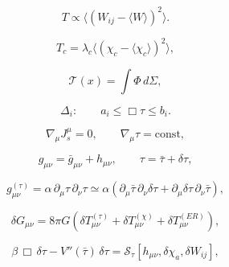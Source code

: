 \[
T \propto \langle (W_{ij} - \langle W\rangle)^2 \rangle.
\]

\[
T_c = \lambda_c \langle (\chi_c - \langle\chi_c\rangle)^2\rangle,
\]

\[
\mathcal{T}(x) = \int \Phi\, d\Sigma,
\]

\[
\Delta_i: \qquad a_i \le \Box \tau \le b_i.
\]

\[
\nabla_\mu J^\mu_s = 0,\qquad \nabla_\mu \tau = \mathrm{const},
\]

\[
g_{\mu\nu} = \bar{g}_{\mu\nu} + h_{\mu\nu},\qquad
\tau = \bar{\tau} + \delta\tau,
\]

\[
g^{(\tau)}_{\mu\nu}
=
\alpha\, \partial_\mu \tau\, \partial_\nu\tau
\simeq
\alpha\left(
\partial_\mu \bar{\tau}\, \partial_\nu \delta\tau
+
\partial_\mu \delta\tau\, \partial_\nu \bar{\tau}
\right),
\]

\[
\delta G_{\mu\nu}
=
8\pi G\left(
\delta T_{\mu\nu}^{(\tau)}
+
\delta T_{\mu\nu}^{(\chi)}
+
\delta T_{\mu\nu}^{(ER)}
\right),
\]

\[
\beta\, \Box\, \delta\tau
- V''(\bar{\tau})\, \delta\tau
=
\mathcal{S}_{\tau}[h_{\mu\nu},\delta\chi_a,\delta W_{ij}],
\]

